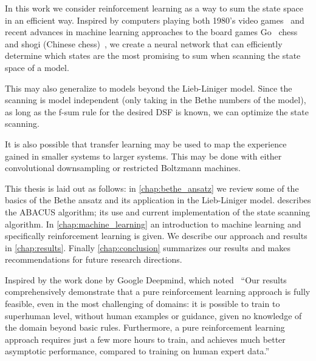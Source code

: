 \documentclass[11pt, a4paper]{report} %
\begin{document}
In this work we consider reinforcement learning as a way to sum the state space in an efficient way.
Inspired by computers playing both 1980's video games~\cite{mnih13_playin_atari_with_deep_reinf_learn,mnih15_human_level_contr_throug_deep_reinf_learn} and recent advances in machine learning approaches to the board games Go~\cite{Silver2017a,silver16_master_game_go_with_deep} chess and shogi (Chinese chess)~\cite{Silver2017}, we create a neural network that can efficiently determine which states are the most promising to sum when scanning the state space of a model.

This may also generalize to models beyond the Lieb-Liniger model.
Since the scanning is model independent (only taking in the Bethe numbers of the model), as long as the f-sum rule for the desired DSF is known, we can optimize the state scanning.

It is also possible that transfer learning may be used to map the experience gained in smaller systems to larger systems.
This may be done with either convolutional downsampling or restricted Boltzmann machines.

This thesis is laid out as follows:
in \cref{chap:bethe_ansatz} we review some of the basics of the Bethe ansatz and its application in the Lieb-Liniger model.
 describes the ABACUS algorithm; its use and current implementation of the state scanning algorithm.
In \cref{chap:machine_learning} an introduction to machine learning and specifically reinforcement learning is given.
We describe our approach and results in \cref{chap:results}.
Finally \cref{chap:conclusion} summarizes our results and makes recommendations for future research directions.


Inspired by the work done by Google Deepmind, which noted~\cite{Silver2017a} ``Our results comprehensively demonstrate that a pure reinforcement learning approach is fully feasible, even in the most challenging of domains: it is possible to train to superhuman level, without human examples or guidance, given no knowledge of the domain beyond basic rules. Furthermore, a pure reinforcement learning approach requires just a few more hours to train, and achieves much better asymptotic performance, compared to training on human expert data.''
\end{document}

